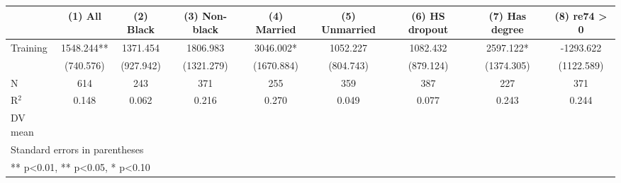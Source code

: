 \begin{table}[htbp]
\centering
\begin{tabular}{lcccccccc}
\hline\hline
 & (1) All & (2) Black & (3) Non-black & (4) Married & (5) Unmarried & (6) HS dropout & (7) Has degree & (8) re74 > 0 \\
\hline
Training & 1548.244** & 1371.454 & 1806.983 & 3046.002* & 1052.227 & 1082.432 & 2597.122* & -1293.622 \\
 & (740.576) & (927.942) & (1321.279) & (1670.884) & (804.743) & (879.124) & (1374.305) & (1122.589) \\
\hline
N & 614 & 243 & 371 & 255 & 359 & 387 & 227 & 371 \\
R$^2$ & 0.148 & 0.062 & 0.216 & 0.270 & 0.049 & 0.077 & 0.243 & 0.244 \\
DV mean &  &  &  &  &  &  &  &  \\
\hline\hline
\multicolumn{9}{l}{\footnotesize Standard errors in parentheses} \\
\multicolumn{9}{l}{\footnotesize *** p<0.01, ** p<0.05, * p<0.10} \\
\end{tabular}
\end{table}